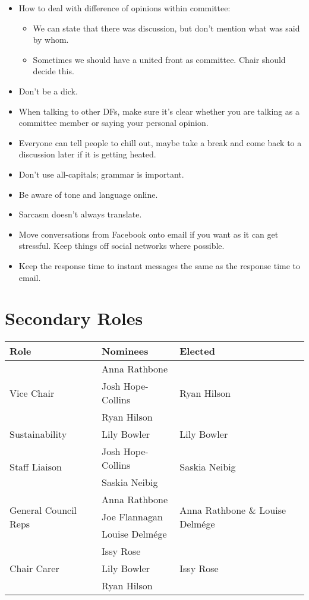 \documentclass[a4paper, 11pt]{article} %
\begin{document}
\begin{itemize}
	\item How to deal with difference of opinions within committee:
	\begin{itemize}
		\item We can state that there was discussion, but don't mention what was said by whom.
		\item Sometimes we should have a united front as committee.  Chair should decide this.
	\end{itemize}
	\item Don't be a dick.
	\item When talking to other DFs, make sure it's clear whether you are talking as a committee member or saying your personal opinion.
	\item Everyone can tell people to chill out, maybe take a break and come back to a discussion later if it is getting heated.
	\item Don't use all-capitals; grammar is important.
	\item Be aware of tone and language online.
	\item Sarcasm doesn't always translate.
	\item Move conversations from Facebook onto email if you want as it can get stressful.  Keep things off social networks where possible.
	\item Keep the response time to instant messages the same as the response time to email.
\end{itemize}

\section{Secondary Roles}
\begin{center}
	\begin{tabular}[H]{l l l} \hline \hline
	\textbf{Role}							& \textbf{Nominees}	& \textbf{Elected} \\ \hline \hline
	\multirow{3}{*}{Vice Chair}				& Anna Rathbone		& \multirow{3}{*}{Ryan Hilson} \\
										& Josh Hope-Collins		& \\
										& Ryan Hilson			& \\ \hline
	Sustainability							& Lily Bowler			& Lily Bowler \\ \hline
	\multirow{2}{*}{Staff Liaison	}			& Josh Hope-Collins		& \multirow{2}{*}{Saskia Neibig} \\
										& Saskia Neibig		& \\ \hline
	\multirow{3}{*}{General Council Reps}		& Anna Rathbone		& \multirow{3}{*}{Anna Rathbone \& Louise Delmége} \\
										& Joe Flannagan		& \\
										& Louise Delmége		& \\ \hline
	\multirow{3}{*}{Chair Carer}			& Issy Rose			& \multirow{3}{*}{Issy Rose} \\
										& Lily Bowler			& \\
										& Ryan Hilson			& \\ \hline \hline
	\end{tabular}
\end{center}
\end{document}
